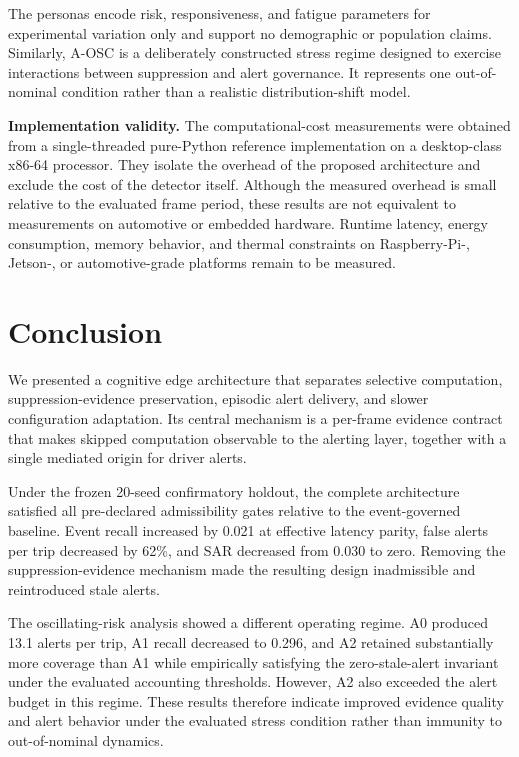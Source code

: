 \documentclass[conference]{IEEEtran}
\begin{document}
The personas encode risk, responsiveness, and fatigue parameters for
experimental variation only and support no demographic or population
claims. Similarly, A-OSC is a deliberately constructed stress regime
designed to exercise interactions between suppression and alert
governance. It represents one out-of-nominal condition rather than a
realistic distribution-shift model.

\textbf{Implementation validity.}
The computational-cost measurements were obtained from a single-threaded
pure-Python reference implementation on a desktop-class x86-64 processor.
They isolate the overhead of the proposed architecture and exclude the
cost of the detector itself. Although the measured overhead is small
relative to the evaluated frame period, these results are not equivalent
to measurements on automotive or embedded hardware. Runtime latency,
energy consumption, memory behavior, and thermal constraints on
Raspberry-Pi-, Jetson-, or automotive-grade platforms remain to be
measured.

\section{Conclusion}
\label{sec:conclusion}

We presented a cognitive edge architecture that separates selective
computation, suppression-evidence preservation, episodic alert delivery,
and slower configuration adaptation. Its central mechanism is a
per-frame evidence contract that makes skipped computation observable to
the alerting layer, together with a single mediated origin for driver
alerts.

Under the frozen 20-seed confirmatory holdout, the complete architecture
satisfied all pre-declared admissibility gates relative to the
event-governed baseline. Event recall increased by 0.021 at effective
latency parity, false alerts per trip decreased by 62\%, and SAR decreased
from 0.030 to zero. Removing the suppression-evidence mechanism made the
resulting design inadmissible and reintroduced stale alerts.

The oscillating-risk analysis showed a different operating regime. A0
produced 13.1 alerts per trip, A1 recall decreased to 0.296, and A2
retained substantially more coverage than A1 while empirically
satisfying the zero-stale-alert invariant under the evaluated
accounting thresholds. However, A2 also exceeded the alert budget in this regime.
These results therefore indicate improved evidence quality and alert
behavior under the evaluated stress condition rather than immunity to
out-of-nominal dynamics.
\end{document}
